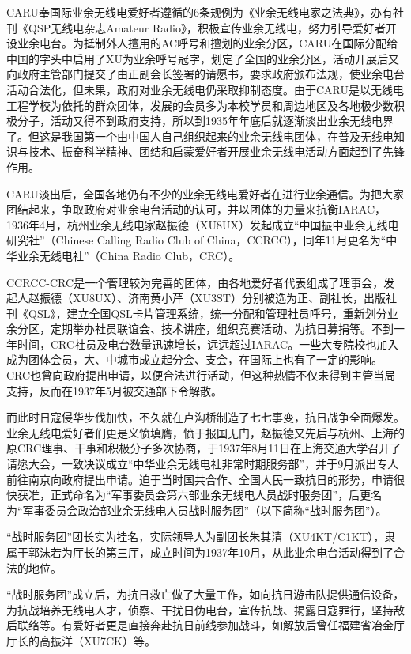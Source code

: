 \documentclass[12pt,UTF8]{ctexbook}
\begin{document}
CARU奉国际业余无线电爱好者遵循的6条规例为《业余无线电家之法典》，办有社刊《QSP无线电杂志Amateur Radio》，积极宣传业余无线电，努力引导爱好者开设业余电台。为抵制外人擅用的AC呼号和擅划的业余分区，CARU在国际分配给中国的字头中启用了XU为业余呼号冠字，划定了全国的业余分区，活动开展后又向政府主管部门提交了由正副会长签署的请愿书，要求政府颁布法规，使业余电台活动合法化，但未果，政府对业余无线电仍采取抑制态度。由于CARU是以无线电工程学校为依托的群众团体，发展的会员多为本校学员和周边地区及各地极少数积极分子，活动又得不到政府支持，所以到1935年年底后就逐渐淡出业余无线电界了。但这是我国第一个由中国人自己组织起来的业余无线电团体，在普及无线电知识与技术、振奋科学精神、团结和启蒙爱好者开展业余无线电活动方面起到了先锋作用。

CARU淡出后，全国各地仍有不少的业余无线电爱好者在进行业余通信。为把大家团结起来，争取政府对业余电台活动的认可，并以团体的力量来抗衡IARAC，1936年4月，杭州业余无线电家赵振德（XU8UX）发起成立“中国振中业余无线电研究社”（Chinese Calling Radio Club of China，CCRCC），同年11月更名为“中华业余无线电社”（China Radio Club，CRC）。

CCRCC-CRC是一个管理较为完善的团体，由各地爱好者代表组成了理事会，发起人赵振德（XU8UX）、济南黄小芹（XU3ST）分别被选为正、副社长，出版社刊《QSL》，建立全国QSL卡片管理系统，统一分配和管理社员呼号，重新划分业余分区，定期举办社员联谊会、技术讲座，组织竞赛活动、为抗日募捐等。不到一年时间，CRC社员及电台数量迅速增长，远远超过IARAC。一些大专院校也加入成为团体会员，大、中城市成立起分会、支会，在国际上也有了一定的影响。CRC也曾向政府提出申请，以便合法进行活动，但这种热情不仅未得到主管当局支持，反而在1937年5月被交通部下令解散。

而此时日寇侵华步伐加快，不久就在卢沟桥制造了七七事变，抗日战争全面爆发。业余无线电爱好者们更是义愤填膺，愤于报国无门，赵振德又先后与杭州、上海的原CRC理事、干事和积极分子多次协商，于1937年8月11日在上海交通大学召开了请愿大会，一致决议成立“中华业余无线电社非常时期服务部”，并于9月派出专人前往南京向政府提出申请。迫于当时国共合作、全国人民一致抗日的形势，申请很快获准，正式命名为“军事委员会第六部业余无线电人员战时服务团”，后更名为“军事委员会政治部业余无线电人员战时服务团”（以下简称“战时服务团”）。

“战时服务团”团长实为挂名，实际领导人为副团长朱其清（XU4KT/C1KT），隶属于郭沫若为厅长的第三厅，成立时间为1937年10月，从此业余电台活动得到了合法的地位。

“战时服务团”成立后，为抗日救亡做了大量工作，如向抗日游击队提供通信设备，为抗战培养无线电人才，侦察、干扰日伪电台，宣传抗战、揭露日寇罪行，坚持敌后联络等。有爱好者更是直接奔赴抗日前线参加战斗，如解放后曾任福建省冶金厅厅长的高振洋（XU7CK）等。
\end{document}

